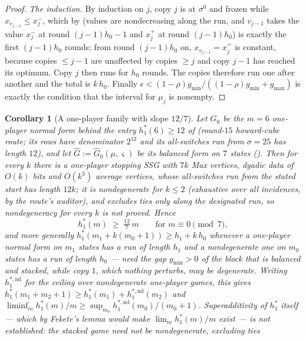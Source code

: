 \documentclass[11pt]{article}
\theoremstyle{plain}
\newtheorem{corollary}[theorem]{Corollary}
\theoremstyle{definition}
\begin{document}
\begin{proof}
\emph{The induction.} By induction on $j$, copy $j$ is at $\sigma^{0}$ and frozen while
$x_{v_{j-1}}\le x^{-}_j$, which by  (values are nondecreasing along the
run, and $v_{j-1}$ takes the value $x^{-}_j$ at round $(j-1)h_0-1$ and $x^{+}_j$ at
round $(j-1)h_0$) is exactly the first $(j-1)h_0$ rounds; from round $(j-1)h_0$ on,
$x_{v_{j-1}}=x^{+}_j$ is constant, because copies $\le j-1$ are unaffected by copies
$\ge j$ and copy $j-1$ has reached its optimum. Copy $j$ then runs for $h_0$ rounds.
The copies therefore run one after another and the total is $k\,h_0$. Finally
$\epsilon<(1-\rho)g_{\min}/((1-\rho)g_{\min}+g_{\max})$ is exactly the condition that
the interval for $\mu_j$ is nonempty.
\end{proof}

\begin{corollary}[A one-player family with slope $12/7$]\label{cor:stack-family}
Let $G_0$ be the $m=6$ one-player normal form behind the entry
$h^{\ast}_{1}(6)\ge12$ of  (round-$15$ howard-cube route; its
rows have denominator $2^{12}$ and its all-switches run from $\sigma=25$ has length
$12$), and let $\widehat G:=\widehat G_0(\mu,\varsigma)$ be its balanced form on $7$
states (). Then for every $k$ there is a one-player
stopping SSG with $7k$ Max vertices, dyadic data of $O(k)$ bits and $O(k^{3})$ average
vertices, whose all-switches run from the stated start has length $12k$;
it is nondegenerate for $k\le2$ (exhaustive over all incidences, by the
route's auditor), and  excludes ties only along the
designated run, so nondegeneracy for every $k$ is not proved. Hence
\[
  h^{\ast}_{1}(m)\;\ge\;\tfrac{12}{7}\,m\qquad\text{for } m\equiv0 \pmod 7 ,
\]
and more generally $h^{\ast}_{1}(m_1+k(m_0+1))\ge h_1+k\,h_0$ whenever a one-player
normal form on $m_1$ states has a run of length $h_1$ and a
\emph{nondegenerate} one on $m_0$ states has a run of length $h_0$ ---
 need the gap $g_{\min}>0$ of the block that
is balanced and stacked, while copy $1$, which nothing perturbs, may be
degenerate. Writing $h^{\ast,\mathrm{nd}}_{1}$ for the ceiling over
nondegenerate one-player games, this gives
$h^{\ast}_{1}(m_1+m_2+1)\ge h^{\ast}_{1}(m_1)+h^{\ast,\mathrm{nd}}_{1}(m_2)$
and $\liminf_m h^{\ast}_{1}(m)/m\ge\sup_{m_0}h^{\ast,\mathrm{nd}}_{1}(m_0)/(m_0+1)$.
Superadditivity of $h^{\ast}_{1}$ itself --- which by Fekete's lemma would
make $\lim_m h^{\ast}_{1}(m)/m$ exist --- is \emph{not} established: the
stacked game need not be nondegenerate,  excluding ties

\end{corollary}
\end{document}
